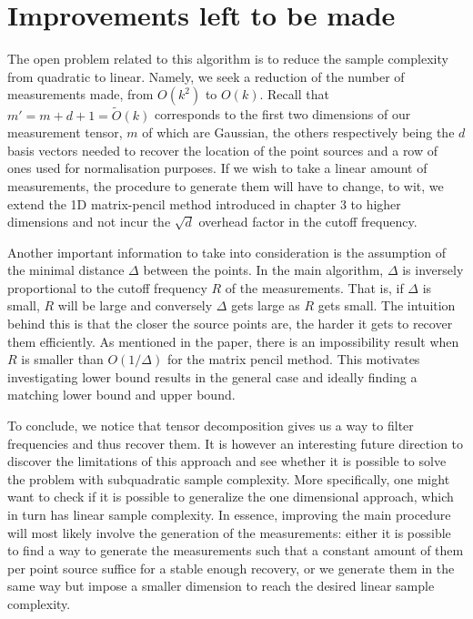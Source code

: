 \section{Improvements left to be made}
The open problem related to this algorithm is to reduce the sample complexity from quadratic to linear. Namely, we seek a reduction of the number of measurements made, from $O(k^2)$ to $O(k)$. Recall that $m'=m+d+1=\widetilde{O}(k)$ corresponds to the first two dimensions of our measurement tensor, $m$ of which are Gaussian, the others respectively being the $d$ basis vectors needed to recover the location of the point sources and a row of ones used for normalisation purposes. If we wish to take a linear amount of measurements, the procedure to generate them will have to change, to wit, we extend the 1D matrix-pencil method introduced in chapter 3 to higher dimensions and not incur the $\sqrt{d}$ overhead factor in the cutoff frequency.\par

Another important information to take into consideration is the assumption of the minimal distance $\Delta$ between the points. In the main algorithm, $\Delta$ is inversely proportional to the cutoff frequency $R$ of the measurements. That is, if $\Delta$ is small, $R$ will be large and conversely $\Delta$ gets large as $R$ gets small. The intuition behind this is that the closer the source points are, the harder it gets to recover them efficiently. As mentioned in the paper, there is an impossibility result when $R$ is smaller than $O(1/\Delta)$ for the matrix pencil method. This motivates investigating lower bound results in the general case and ideally finding a matching lower bound and upper bound. \par

To conclude, we notice that tensor decomposition gives us a way to filter frequencies and thus recover them. It is however an interesting future direction to discover the limitations of this approach and see whether it is possible to solve the problem with subquadratic sample complexity. More specifically, one might want to check if it is possible to generalize the one dimensional approach, which in turn has linear sample complexity. In essence, improving the main procedure will most likely involve the generation of the measurements: either it is possible to find a way to generate the measurements such that a constant amount of them per point source suffice for a stable enough recovery, or we generate them in the same way but impose a smaller dimension to reach the desired linear sample complexity.